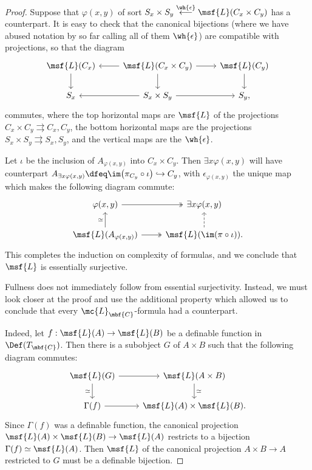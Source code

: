 \documentclass[11pt]{article}
\begin{document}
\begin{proof}
  Suppose that $\varphi(x,y)$ of sort $S_x \times S_y \overset{\wh{\epsilon}}{\longleftarrow} \msf{L}(C_x \times C_y)$ has a counterpart. It is easy to check that the canonical bijections (where we have abused notation by so far calling all of them $\wh{\epsilon}$) are compatible with projections, so that the diagram
  $$
  \begin{tikzcd}[ampersand replacement = \&]
   \msf{L}(C_x) \arrow{d} \&  \msf{L}(C_x \times C_y) \arrow{d}\arrow{l} \arrow{r} \& \msf{L}(C_y) \arrow{d} \\
 S_x    \& S_x \times S_y \arrow{l} \arrow{r} \& S_y,
  \end{tikzcd}
  $$
  commutes, where the top horizontal maps are $\msf{L}$ of the projections $C_x \times C_y \rightrightarrows C_x, C_y$, the bottom horizontal maps are the projections $S_x \times S_y \rightrightarrows S_x, S_y$, and the vertical maps are the $\wh{\epsilon}$.

  Let $\iota$ be the inclusion of $A_{\varphi(x,y)}$ into $C_x \times C_y$. Then $\exists x \varphi(x,y)$ will have counterpart $A_{\exists x \varphi(x,y)} \dfeq \im \bigl( \pi_{C_y} \circ \iota \bigr) \hookrightarrow C_y$, with $\epsilon_{\varphi(x,y)}$ the unique map which makes the following diagram commute:
  $$
  \begin{tikzcd}[ampersand replacement = \&]
 \varphi(x,y) \arrow[two heads]{r}   \& \exists x \varphi(x,y) \\
\msf{L}(A_{\varphi(x,y)}) \arrow{u}{\simeq} \arrow[two heads]{r}    \& \msf{L}(\im(\pi \circ \iota)) \arrow[dashed]{u}.
  \end{tikzcd}
  $$
  This completes the induction on complexity of formulas, and we conclude that $\msf{L}$ is essentially surjective.

  Fullness does not immediately follow from essential surjectivity. Instead, we must look closer at the proof and use the additional property which allowed us to conclude that every $\mc{L}_{\mbf{C}}$-formula had a counterpart.

  Indeed, let $f : \msf{L}(A) \to \msf{L}(B)$ be a definable function in $\Def(T_{\mbf{C}})$. Then there is a subobject $G$ of $A \times B$ such that the following diagram commutes:
  $$
  \begin{tikzcd}[ampersand replacement = \&]
  \msf{L}(G) \arrow{r} \arrow[swap]{d}{\simeq}  \& \msf{L}(A \times B) \arrow{d}{\simeq} \\
\Gamma(f) \arrow{r}    \& \msf{L}(A) \times \msf{L}(B).
\end{tikzcd}
$$
    Since $\Gamma(f)$ was a definable function, the canonical projection $\msf{L}(A) \times \msf{L}(B) \to \msf{L}(A)$ restricts to a bijection $\Gamma(f) \simeq \msf{L}(A)$. Then $\msf{L}$ of the canonical projection $A \times B \to A$ restricted to $G$ must be a definable bijection.


\end{proof}
\end{document}
